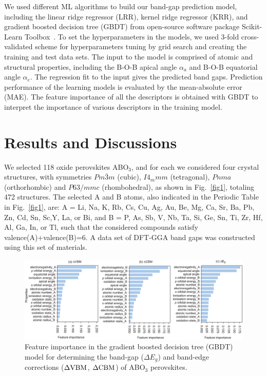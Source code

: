 \documentclass[%
reprint,
superscriptaddress,
citeautoscript,
 amsmath,amssymb,
 aps,
 prl,
floatfix,
]{revtex4-1}
\begin{document}
We used different ML algorithms to build our band-gap prediction model, including the linear ridge regressor (LRR), kernel ridge regressor (KRR), and gradient boosted decision tree (GBDT) from open-source software package Scikit-Learn Toolbox~\cite{scikit-learn}.  
To set the hyperparameters in the models, we used 3-fold cross-validated scheme for hyperparameters tuning by grid search and creating the training and test data sets.
The input to the model is comprised of atomic and structural properties, including
the B-O-B apical angle $\alpha_{a}$ and B-O-B equatorial angle $\alpha_{e}$.
The regression fit to the input gives the predicted band gaps. Prediction performance of the learning models is evaluated by the mean-absolute error (MAE). 
The feature importance of all the descriptors is obtained with GBDT to interpret the importance of various descriptors in the training model.

\section{Results and Discussions}

We selected 118 oxide perovskites ABO$_{3}$, and for each we considered four crystal structures, with symmetries $Pm\bar{3}m$ (cubic), $I4_mmm$ (tetragonal), $Pnma$ (orthorhombic) and $P63/mmc$ (rhombohedral), as shown in Fig.~\ref{fig1}, totaling 472 structures. The selected A and B atoms, also indicated in the Periodic Table in Fig.~\ref{fig1}, are: A = Li, Na, K, Rb, Cs, Cu, Ag, Au, Be, Mg, Ca, Sr, Ba, Pb, Zn, Cd, Sn, Sc,Y, La, or Bi, and B = P, As, Sb, V,  Nb, Ta, Si, Ge, Sn, Ti, Zr, Hf, Al, Ga, In, or Tl, such that the considered compounds satisfy valence(A)+valence(B)=6. A data set of DFT-GGA band gaps was constructed using this set of materials.

\begin{figure}[ht]
\begin{center}
\includegraphics[width=6.6in]{Figures/feature_ranking_gap.eps}
\end{center}
\caption{Feature importance in the gradient boosted decision tree (GBDT) model for determining the band-gap ($\Delta E_{g}$) and band-edge corrections ($\Delta {\rm VBM}$, $\Delta {\rm CBM}$) of ABO$_3$ perovskites. 
}
\label{fig3}
\end{figure}
\end{document}
